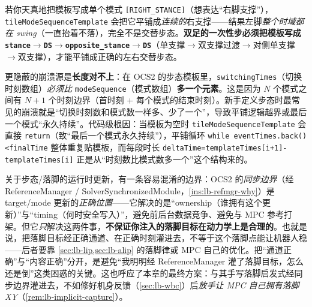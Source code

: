 \begin{pitfall}\label{pit:lb-tile}
若你天真地把模板写成单个模式 \texttt{[RIGHT\_STANCE]}（想表达“右脚支撑”），\texttt{tileModeSequenceTemplate} 会把它平铺成\emph{连续的}右支撑——结果左脚\emph{整个时域都在 swing}（一直抬着不落），完全不是交替步态。\textbf{双足的一次性步必须把模板写成 \texttt{stance$\to$DS$\to$opposite\_stance$\to$DS}}（单支撑$\to$双支撑过渡$\to$对侧单支撑$\to$双支撑），才能平铺成正确的左右交替步态。

更隐蔽的崩溃源是\textbf{长度对不上}：在 OCS2 的步态模板里，\texttt{switchingTimes}（切换时刻数组）\emph{必须比} \texttt{modeSequence}（模式数组）\textbf{多一个元素}。这是因为 $N$ 个模式之间有 $N+1$ 个时刻边界（首时刻 + 每个模式的结束时刻）。新手定义步态时最常见的崩溃就是“切换时刻数和模式数一样多、少了一个”，导致平铺逻辑越界或最后一个模式“永久持续”。代码级根因：当模板为空时 \texttt{tileModeSequenceTemplate} 会直接 \texttt{return}（致“最后一个模式永久持续”），平铺循环 \texttt{while eventTimes.back()<finalTime} 整体重复贴模板，而每段时长 \texttt{deltaTime=templateTimes[i+1]-templateTimes[i]} 正是从“时刻数比模式数多一个”这个结构来的。
\end{pitfall}

\begin{insight}\label{ins:lb-sync-boundary}
关于步态/落脚的运行时更新，有一条容易混淆的边界：OCS2 的\emph{同步边界}（经 ReferenceManager / SolverSynchronizedModule，\cref{ins:lb-refmgr-why}）是 target/mode 更新的\emph{正确位置}——它解决的是“ownership（谁拥有这个更新）”与“timing（何时安全写入）”，避免前后台数据竞争、避免与 MPC 参考打架。但它\emph{只}解决这两件事，\textbf{不保证你注入的落脚目标在动力学上是合理的}。也就是说，把落脚目标经正确通道、在正确时刻灌进去，不等于这个落脚点能让机器人稳——后者要靠 \cref{sec:lb-lip,sec:lb-alip} 的落脚律或 MPC 自己的优化。把“通道正确”与“内容正确”分开，是避免“我明明经 ReferenceManager 灌了落脚目标，怎么还是倒”这类困惑的关键。这也呼应了本章的最终方案：与其手写落脚启发式经同步边界灌进去，不如修好机身反馈（\cref{sec:lb-wbc}）后\emph{放手让 MPC 自己拥有落脚 XY}（\cref{rem:lb-implicit-capture}）。
\end{insight}

